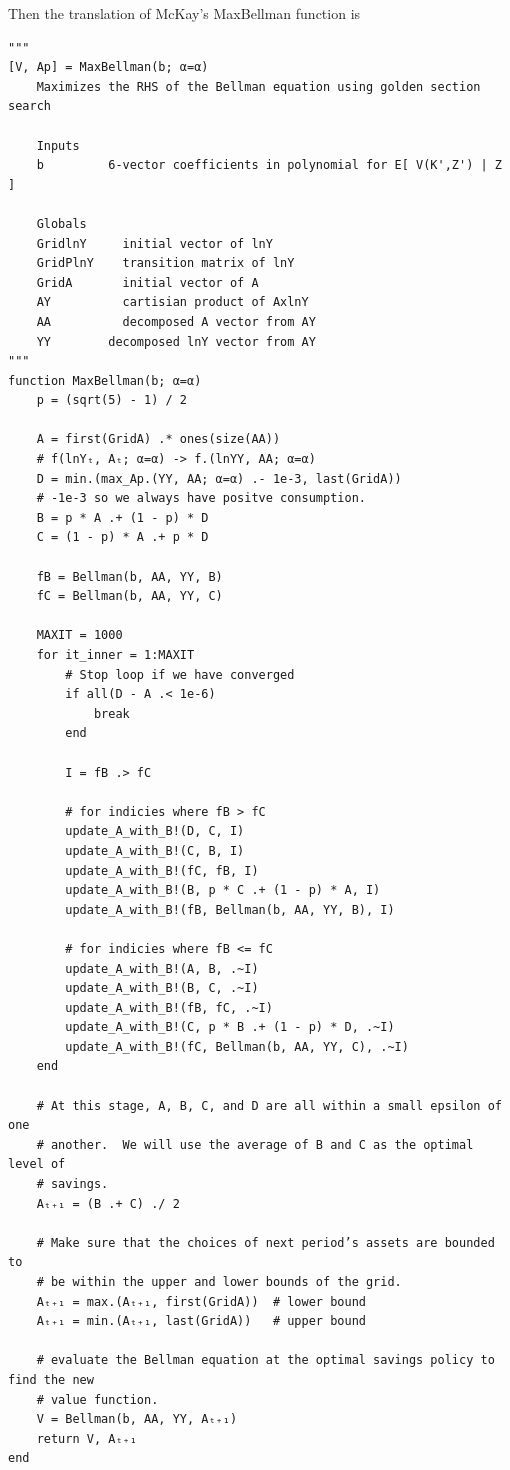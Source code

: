 \documentclass[12pt]{article}
\begin{document}
Then the translation of McKay's MaxBellman function is
\begin{lstlisting}[language=JuliaLocal, style=julia]
"""
[V, Ap] = MaxBellman(b; α=α)
    Maximizes the RHS of the Bellman equation using golden section search

    Inputs
    b         6-vector coefficients in polynomial for E[ V(K',Z') | Z ]

    Globals
    GridlnY     initial vector of lnY
    GridPlnY    transition matrix of lnY
    GridA       initial vector of A
    AY          cartisian product of AxlnY
    AA          decomposed A vector from AY
    YY        decomposed lnY vector from AY
"""
function MaxBellman(b; α=α)
    p = (sqrt(5) - 1) / 2

    A = first(GridA) .* ones(size(AA))
    # f(lnYₜ, Aₜ; α=α) -> f.(lnYY, AA; α=α)
    D = min.(max_Ap.(YY, AA; α=α) .- 1e-3, last(GridA))
    # -1e-3 so we always have positve consumption.
    B = p * A .+ (1 - p) * D
    C = (1 - p) * A .+ p * D

    fB = Bellman(b, AA, YY, B)
    fC = Bellman(b, AA, YY, C)

    MAXIT = 1000
    for it_inner = 1:MAXIT
        # Stop loop if we have converged
        if all(D - A .< 1e-6)
            break
        end

        I = fB .> fC

        # for indicies where fB > fC
        update_A_with_B!(D, C, I)
        update_A_with_B!(C, B, I)
        update_A_with_B!(fC, fB, I)
        update_A_with_B!(B, p * C .+ (1 - p) * A, I)
        update_A_with_B!(fB, Bellman(b, AA, YY, B), I)

        # for indicies where fB <= fC
        update_A_with_B!(A, B, .~I)
        update_A_with_B!(B, C, .~I)
        update_A_with_B!(fB, fC, .~I)
        update_A_with_B!(C, p * B .+ (1 - p) * D, .~I)
        update_A_with_B!(fC, Bellman(b, AA, YY, C), .~I)
    end

    # At this stage, A, B, C, and D are all within a small epsilon of one
    # another.  We will use the average of B and C as the optimal level of
    # savings.
    Aₜ₊₁ = (B .+ C) ./ 2

    # Make sure that the choices of next period’s assets are bounded to 
    # be within the upper and lower bounds of the grid.
    Aₜ₊₁ = max.(Aₜ₊₁, first(GridA))  # lower bound
    Aₜ₊₁ = min.(Aₜ₊₁, last(GridA))   # upper bound

    # evaluate the Bellman equation at the optimal savings policy to find the new
    # value function.
    V = Bellman(b, AA, YY, Aₜ₊₁)
    return V, Aₜ₊₁
end
\end{lstlisting}
\end{document}
